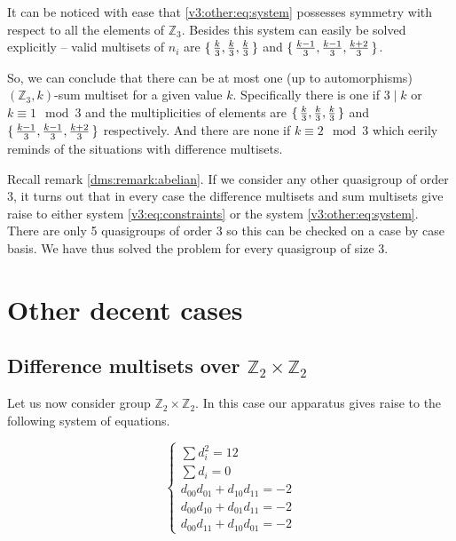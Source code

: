 \documentclass{article}
\theoremstyle{plain}
\theoremstyle{definition}
\theoremstyle{remark}
\begin{document}
			It can be noticed with ease that \eqref{v3:other:eq:system} possesses symmetry with respect to all the elements of $\mathbb Z_3$. Besides this system can easily be solved explicitly -- valid multisets of $n_i$ are $\set{\frac k 3, \frac k 3, \frac k 3}$ and $\set{\frac{k-1}{3}, \frac{k-1}{3}, \frac{k+2}{3}}$.
			
			So, we can conclude that there can be at most one (up to automorphisms) $(\mathbb Z_3, k)$-sum multiset for a given value $k$. Specifically there is one if $3 \mid k$ or $k \equiv 1 \mod 3$ and the multiplicities of elements are $\set{\frac k 3, \frac k 3, \frac k 3}$ and $\set{\frac{k-1}{3}, \frac{k-1}{3}, \frac{k+2}{3}}$ respectively. And there are none if $k \equiv 2 \mod 3$ which eerily reminds of the situations with difference multisets.
			
			Recall remark \ref{dms:remark:abelian}. If we consider any other quasigroup of order 3, it turns out that in every case the difference multisets and sum multisets give raise to either system \eqref{v3:eq:constraints} or the system \eqref{v3:other:eq:system}. There are only 5 quasigroups of order 3 so this can be checked on a case by case basis. We have thus solved the problem for every quasigroup of size 3.
	
    \section{Other decent cases}
        \subsection{Difference multisets over $\mathbb Z_2 \times \mathbb Z_2$}
            Let us now consider group $\mathbb Z_2 \times \mathbb Z_2$. In this case our apparatus gives raise to the following system of equations.
            
            \begin{equation}
                \label{v4:eq:constraints}
                \begin{cases}
                    \sum d_i^2 = 12 \\
                    \sum d_i = 0 \\
                    d_{00} d_{01} + d_{10} d_{11} = -2 \\
                    d_{00} d_{10} + d_{01} d_{11} = -2 \\
                    d_{00} d_{11} + d_{10} d_{01} = -2
                \end{cases}
            \end{equation}
            
\end{document}
